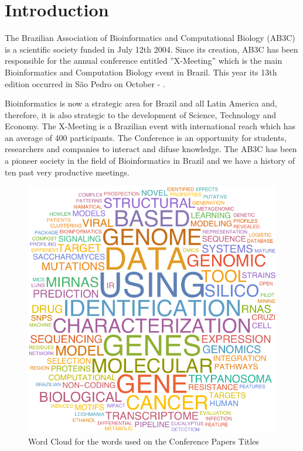 \newpage
\chapter{Introduction}
The Brazilian Association of Bioinformatics and Computational Biology (AB3C) is
a scientific society funded in July 12th 2004.
Since its creation, AB3C has been responsible for the annual conference entitled
''X-Meeting'' which is the main Bioinformatics and Computation Biology event in
Brazil. This year its 13th edition occurred in S\~ao Pedro on October
- .

	
Bioinformatics is now a strategic area for Brazil and all Latin America and,
therefore, it is also strategic to the development of Science, Technology and
Economy. The X-Meeting is a Brazilian event with international reach which has
an average of 400 participants. The Conference is an opportunity for students,
researchers and companies to interact and difuse knowledge. The AB3C has been a
pioneer society in the field of Bioinformatics in Brazil and we have a history
of ten past very productive meetings.

\begin{figure}[h]
    \begin{center}
  \includegraphics[scale=0.7]{wordcloud}
\end{center}
\caption{Word Cloud for the words used on the Conference Papers Titles}
\end{figure}


